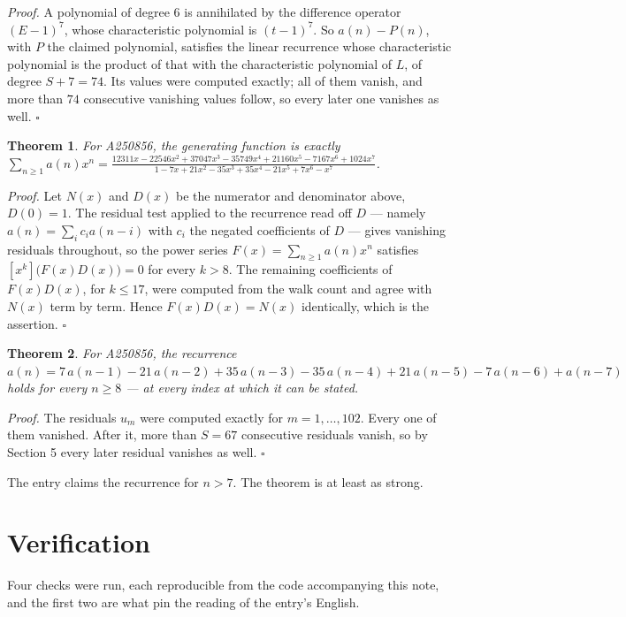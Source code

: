 \documentclass[11pt]{article}
\newtheorem{theorem}{Theorem}
\theoremstyle{definition}
\begin{document}
{\itshape Proof.} A polynomial of degree $6$ is annihilated by the difference operator $(E-1)^{7}$, whose characteristic polynomial is $(t-1)^{7}$. So $a(n) - P(n)$, with $P$ the claimed polynomial, satisfies the linear recurrence whose characteristic polynomial is the product of that with the characteristic polynomial of $L$, of degree $S + 7 = 74$. Its values were computed exactly; all of them vanish, and more than $74$ consecutive vanishing values follow, so every later one vanishes as well. $\square$

\begin{theorem} For A250856, the generating function is exactly $\sum_{n\ge 1} a(n)x^n = \frac{12311x - 22546x^{2} + 37047x^{3} - 35749x^{4} + 21160x^{5} - 7167x^{6} + 1024x^{7}}{1 - 7x + 21x^{2} - 35x^{3} + 35x^{4} - 21x^{5} + 7x^{6} - x^{7}}$.\end{theorem}

{\itshape Proof.} Let $N(x)$ and $D(x)$ be the numerator and denominator above, $D(0)=1$. The residual test applied to the recurrence read off $D$ --- namely $a(n) = \sum_i c_i a(n-i)$ with $c_i$ the negated coefficients of $D$ --- gives vanishing residuals throughout, so the power series $F(x)=\sum_{n\ge 1}a(n)x^n$ satisfies $[x^k]\bigl(F(x)D(x)\bigr) = 0$ for every $k > 8$. The remaining coefficients of $F(x)D(x)$, for $k \le 17$, were computed from the walk count and agree with $N(x)$ term by term. Hence $F(x)D(x) = N(x)$ identically, which is the assertion. $\square$

\begin{theorem} For A250856, the recurrence $a(n) = 7\,a(n-1) - 21\,a(n-2) + 35\,a(n-3) - 35\,a(n-4) + 21\,a(n-5) - 7\,a(n-6) + a(n-7)$ holds for every $n \ge 8$ --- at every index at which it can be stated.\end{theorem}

{\itshape Proof.} The residuals $u_m$ were computed exactly for $m = 1,\dots,102$. Every one of them vanished. After it, more than $S = 67$ consecutive residuals vanish, so by Section 5 every later residual vanishes as well. $\square$

The entry claims the recurrence for $n > 7$. The theorem is at least as strong.

\section{Verification}

Four checks were run, each reproducible from the code accompanying this note, and the first two are what pin the reading of the entry's English.
\end{document}

